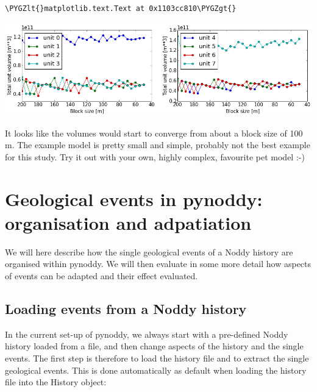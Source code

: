 \documentclass[a4paper,10pt,english]{sphinxmanual}
\def\PYGZlt{\char`\<}
\def\PYGZgt{\char`\>}
\begin{document}
\begin{Verbatim}[commandchars=\\\{\}]
\PYGZlt{}matplotlib.text.Text at 0x1103cc810\PYGZgt{}
\end{Verbatim}

\includegraphics{2-Adjust-input_37_1.png}

It looks like the volumes would start to converge from about a block
size of 100 m. The example model is pretty small and simple, probably
not the best example for this study. Try it out with your own, highly
complex, favourite pet model :-)


\chapter{Geological events in pynoddy: organisation and adpatiation}
\label{notebooks/3-Events:geological-events-in-pynoddy-organisation-and-adpatiation}\label{notebooks/3-Events::doc}
We will here describe how the single geological events of a Noddy
history are organised within pynoddy. We will then evaluate in some more
detail how aspects of events can be adapted and their effect evaluated.


\section{Loading events from a Noddy history}
\label{notebooks/3-Events:loading-events-from-a-noddy-history}
In the current set-up of pynoddy, we always start with a pre-defined
Noddy history loaded from a file, and then change aspects of the history
and the single events. The first step is therefore to load the history
file and to extract the single geological events. This is done
automatically as default when loading the history file into the History
object:
\end{document}
